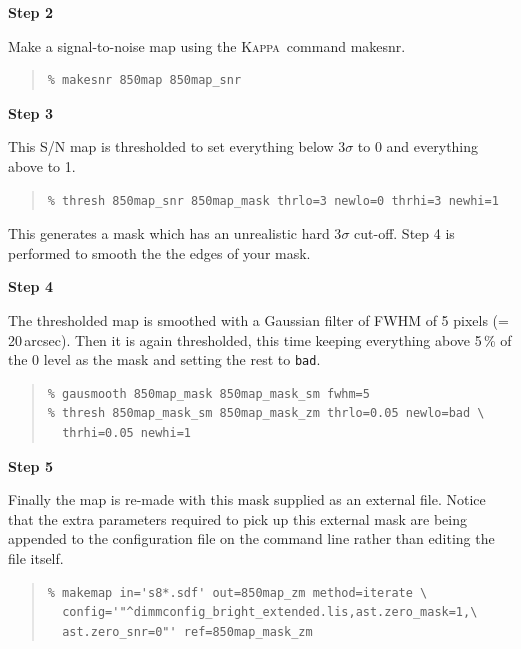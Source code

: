 \documentclass[twoside,11pt]{article}
\newcommand{\xref}[3]{#1}
\renewcommand{\_}{\texttt{\symbol{95}}}
\newenvironment{myquote}{
   \color{MidnightBlue}\begin{quote}\begin{small}}{
   \end{small}\end{quote}
}
\newcommand{\Kappa}{\xref{\textsc{Kappa}}{sun95}{}}
\newcommand{\task}[1]{\textsf{#1}}
\newcommand{\makesnr}{\xref{\task{makesnr}}{sun95}{MAKESNR}}
\renewenvironment{myquote}{
      \begin{quote}\begin{small}}{
      \end{small}\end{quote}
   }
\begin{document}
\begin{minipage}[t]{0.1\linewidth}
\textbf{Step 2}
\end{minipage}
\begin{minipage}[t]{0.9\linewidth}Make a signal-to-noise map using the \Kappa\ command
\makesnr.
\begin{myquote}
\begin{verbatim}
% makesnr 850map 850map_snr
\end{verbatim}
\end{myquote}
\end{minipage}


\begin{minipage}[t]{0.1\linewidth}
\textbf{Step 3}
\end{minipage}
\begin{minipage}[t]{0.9\linewidth}This S/N map is thresholded to set everything below
3$\sigma$ to 0 and everything above to 1.
\begin{myquote}
\begin{verbatim}
% thresh 850map_snr 850map_mask thrlo=3 newlo=0 thrhi=3 newhi=1
\end{verbatim}
\end{myquote}
This generates a mask which has an unrealistic hard 3$\sigma$ cut-off. Step 4
is performed to smooth the the edges of your mask.\\
\end{minipage}


\begin{minipage}[t]{0.1\linewidth}
\textbf{Step 4}
\end{minipage}
\begin{minipage}[t]{0.9\linewidth}The thresholded map is smoothed with a Gaussian filter
of FWHM of 5 pixels (=\,20\,arcsec). Then it is again thresholded, this time
keeping everything above 5\,\% of the 0 level as the mask and setting
the rest to \texttt{bad}.
\begin{myquote}
\begin{verbatim}
% gausmooth 850map_mask 850map_mask_sm fwhm=5
% thresh 850map_mask_sm 850map_mask_zm thrlo=0.05 newlo=bad \
  thrhi=0.05 newhi=1
\end{verbatim}
\end{myquote}
\end{minipage}


\begin{minipage}[t]{0.1\linewidth}
\textbf{Step 5}
\end{minipage}
\begin{minipage}[t]{0.9\linewidth}Finally the map is re-made with this mask supplied as an external
file. Notice that the extra parameters required to pick up this external
mask are being appended to the configuration file on the command line
rather than editing the file itself.
\begin{myquote}
\begin{verbatim}
% makemap in='s8*.sdf' out=850map_zm method=iterate \
  config='"^dimmconfig_bright_extended.lis,ast.zero_mask=1,\
  ast.zero_snr=0"' ref=850map_mask_zm
\end{verbatim}
\end{myquote}
\end{minipage}
\end{document}
